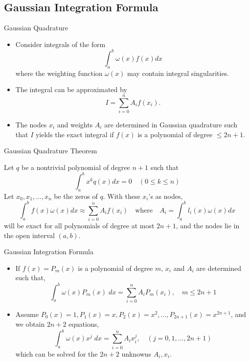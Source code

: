\documentclass{beamer}
\begin{document}
\subsection[Gaussian Integration Formula]{Gaussian Integration Formula}
\begin{frame}{Gaussian Quadrature}
\begin{itemize}
\item Consider integrals of the form
\[
\int_a ^b \omega (x) f(x) dx
\]
where the weighting function $\omega(x)$ may contain integral singularities.
\item The integral can be approximated by 
\[
I=\sum_{i=0}^n A_i f(x_i).
\]
\item The nodes $x_i$ and weights $A_i$ are determined in Gaussian quadrature such that $I$ yields the exact integral if $f(x)$ is a polynomial of degree $\le 2n +1$.
\end{itemize}
\end{frame}
\begin{frame}{Gaussian Quadrature Theorem}
\begin{theorem}


Let $q$ be a nontrivial polynomial of degree $n+1$ such that
\[
\int_a^b x^k q(x) dx=0\quad (0\le k\le n)
\]
Let $x_0, x_1, \ldots, x_n$ be the zeros of $q$. With these $x_i$'s as nodes, 
\[
\int_a^b f(x) \omega(x) dx \approx \sum_{i=0}^n A_i f(x_i) \quad\mbox{where} \quad A_i=\int_a^b l_i(x)\omega(x)  dx 
\]
will be exact for all polynomials of degree at most $2n+1$, and the nodes lie in the open interval $(a,b)$.
\end{theorem}
\end{frame}
\begin{frame}{Gaussian Integration Formula}
\begin{itemize}
\item If $f(x)=P_m(x)$ is a polynomial of degree $m$, $x_i$ and $A_i$ are determined such that,
\[
\int_a ^b \omega(x) P_m(x)\; dx =\sum_{i=0}^n A_i P_m(x_i), \quad m\le 2n+1
\]
\item Assume $P_0(x)=1, P_1(x)=x, P_2(x)=x^2, \ldots, P_{2n+1}(x)=x^{2n+1}$, and we obtain $2n+2$ equations,
\[
\int_a ^b \omega(x) x^j \; dx =\sum_{i=0}^n A_i x^j_i, \quad (j=0, 1, \ldots, 2n+1)
\]
which can be solved for the $2n+2$ unknowns $A_i, x_i$.
 
\end{itemize}
\end{frame}
\end{document}

